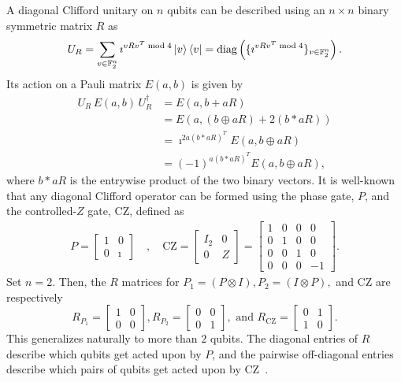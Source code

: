\documentclass[journal,onecolumn]{IEEEtran}
\begin{document}
A diagonal Clifford unitary on $n$ qubits can be described using an $n \times n$ binary symmetric matrix $R$ as~\cite{Dehaene-physreva03,Rengaswamy-tqe20} 
\begin{align}
U_R = \sum_{v \in \mathbb{F}_2^n} \imath^{vRv^T \bmod 4} \dketbra{v} = \text{diag}\left( \{ \imath^{vRv^T \bmod 4} \}_{v \in \mathbb{F}_2^n} \right).
\end{align}
Its action on a Pauli matrix $E(a,b)$ is given by~\cite{Rengaswamy-pra19,Rengaswamy-tqe20} 
\begin{align}
U_R \, E(a,b) \, U_R^{\dagger} & = E(a, b+aR) \\
%
  & = E(a, (b \oplus aR) + 2(b \ast aR)) \\
%
  & = \imath^{2 a (b \ast aR)^T} E(a, b \oplus aR) \\
% 
  & = (-1)^{a (b \ast aR)^T} E(a, b \oplus aR),
\end{align}
where $b \ast aR$ is the entrywise product of the two binary vectors.
It is well-known that any diagonal Clifford operator can be formed using the phase gate, $P$, and the controlled-$Z$ gate, CZ, defined as
\begin{align}
P = 
\begin{bmatrix}
1 & 0 \\
0 & \imath
\end{bmatrix} \quad , \quad
\text{CZ} = 
\begin{bmatrix}
I_2 & 0 \\
0 & Z
\end{bmatrix} =
\begin{bmatrix}
1 & 0 & 0 & 0 \\
0 & 1 & 0 & 0 \\
0 & 0 & 1 & 0 \\
0 & 0 & 0 & -1
\end{bmatrix}.
\end{align}
Set $n=2$.
Then, the $R$ matrices for $P_1 = (P \otimes I), P_2 = (I \otimes P),$ and CZ are respectively 
$$ R_{P_1} = \begin{bmatrix} 1 & 0 \\ 0 & 0 \end{bmatrix}, 
R_{P_2} = \begin{bmatrix} 0 & 0 \\ 0 & 1 \end{bmatrix}, \text{ and }
R_{\text{CZ}} = \begin{bmatrix} 0 & 1 \\ 1 & 0 \end{bmatrix}. $$
This generalizes naturally to more than $2$ qubits.
The diagonal entries of $R$ describe which qubits get acted upon by $P$, and the pairwise off-diagonal entries describe which pairs of qubits get acted upon by CZ~\cite{Rengaswamy-tqe20}.
\end{document}
